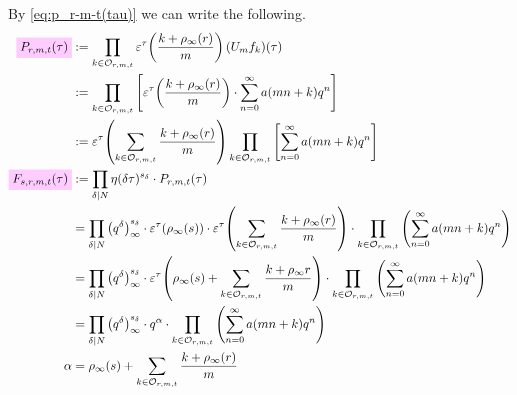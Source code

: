 \documentclass{article}
\begin{document}
\begin{Hemmecke}
By \eqref{eq:p_r-m-t(tau)} we can write the following.
\begin{align}
  \defineNotation[P-r-m-t]{P_{r, m, t}(\tau)}
  &:= \prod_{k \in \modularOrbit{r,m,t}}
    \unityPowerTau{\frac{k+\rho_\infty(r)}{m}} (U_mf_{k})(\tau)\\
  &:= \prod_{k \in \modularOrbit{r,m,t}}
    \left[\unityPowerTau{\frac{k+\rho_\infty(r)}{m}}
    \cdot \sum_{n=0}^\infty a(mn+k) q^n\right]
  \\
  &:=
    \unityPowerTau{\sum_{k\in\modularOrbit{r,m,t}}\frac{k+\rho_\infty(r)}{m}}
    \prod_{k \in \modularOrbit{r,m,t}} \left[\sum_{n=0}^\infty a(mn+k) q^n\right]
  \\
  \defineNotation[F-s-r-m-t]{F_{s, r, m, t}(\tau)}
  &:= \divisorprod{N} \eta(\delta\tau)^{s_\delta} \cdot P_{r,m,t}(\tau)
  \\
  &= \divisorprod{N} \eulerFunction{\delta}^{s_\delta}
    \cdot
    \unityPowerTau{\rho_\infty(s)}
    \cdot
    \unityPowerTau{\sum_{k\in\modularOrbit{r,m,t}}\frac{k+\rho_\infty(r)}{m}}
    \cdot
    \prod_{k \in \modularOrbit{r,m,t}} \left(\sum_{n=0}^\infty a(mn+k) q^n\right)
  \\
  &= \divisorprod{N} \eulerFunction{\delta}^{s_\delta}
    \cdot
    \unityPowerTau{
    \rho_\infty(s)
    +
    \sum_{k\in\modularOrbit{r,m,t}}\frac{k+\rho_\infty{r}}{m}
    }
    \cdot
    \prod_{k \in \modularOrbit{r,m,t}} \left(\sum_{n=0}^\infty a(mn+k) q^n\right)
  \\
  &= \divisorprod{N} \eulerFunction{\delta}^{s_\delta}
    \cdot
    q^\alpha
    \cdot
    \prod_{k \in \modularOrbit{r,m,t}} \left(\sum_{n=0}^\infty a(mn+k) q^n\right)
  \\
  \alpha
  &=
    \rho_\infty(s)
    +
    \sum_{k\in\modularOrbit{r,m,t}}\frac{k+\rho_\infty(r)}{m}
    \label{eq:alphaInfinity}
\end{align}


\end{Hemmecke}
\end{document}
